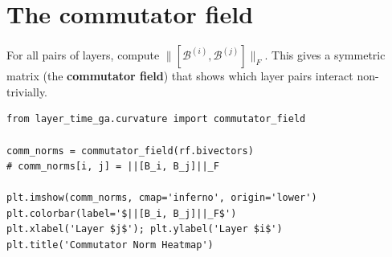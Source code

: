 \documentclass[11pt, twoside, openright]{memoir}
\newcommand{\bivec}[1]{\mathcal{B}^{(#1)}}  %
\numberwithin{equation}{chapter}
\begin{document}
\section{The commutator field}
\label{sec:commutator-field}

For all pairs of layers, compute $\|[\bivec{i}, \bivec{j}]\|_F$.  This
gives a symmetric matrix (the \textbf{commutator field}) that shows
which layer pairs interact non-trivially.

\begin{lstlisting}[caption={The commutator heatmap}]
from layer_time_ga.curvature import commutator_field

comm_norms = commutator_field(rf.bivectors)
# comm_norms[i, j] = ||[B_i, B_j]||_F

plt.imshow(comm_norms, cmap='inferno', origin='lower')
plt.colorbar(label='$||[B_i, B_j]||_F$')
plt.xlabel('Layer $j$'); plt.ylabel('Layer $i$')
plt.title('Commutator Norm Heatmap')
\end{lstlisting}
\end{document}
